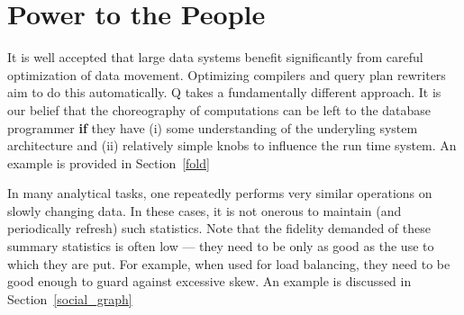 \section{Power to the People}

It is well accepted that large data systems benefit significantly 
from careful optimization of data movement. Optimizing compilers and query plan
rewriters aim to do this automatically.
Q takes a fundamentally different approach. It is our belief that the
choreography of computations can be left to the database programmer {\bf if} 
they have (i) some understanding of the underyling
system architecture and (ii) relatively simple knobs to influence the run time
system.  An example is provided in Section~\ref{fold}

In many analytical tasks, one repeatedly performs very similar operations on slowly
changing data. In these cases, 
it is not onerous to maintain (and periodically refresh) such statistics. 
Note that the fidelity demanded of these summary statistics is often low ---
they need to be only as good as the use to which they are put. For example, when
used for load balancing, they need to be good enough to guard against excessive
skew.
An example is discussed in Section~\ref{social_graph}




